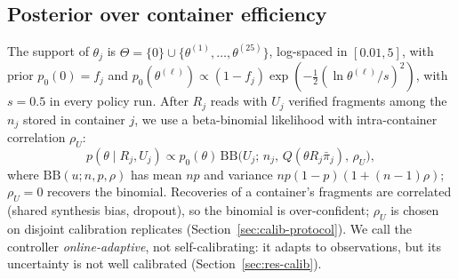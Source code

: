 \documentclass[conference,onecolumn,11pt]{IEEEtran}
\begin{document}
\subsection{Posterior over container efficiency}
The support of $\theta_j$ is $\Theta=\{0\}\cup\{\theta^{(1)},\dots,\theta^{(25)}\}$, log-spaced in
$[0.01,5]$, with prior $p_0(0)=f_j$ and $p_0(\theta^{(\ell)})\propto(1-f_j)\exp(-\frac12(\ln\theta^{(\ell)}/s)^2)$,
with $s=0.5$ in every policy run.  After $R_j$ reads with $U_j$ verified fragments among the $n_j$ stored in container
$j$, we use a beta-binomial likelihood with intra-container correlation $\rho_U$:
\begin{equation}
p(\theta\mid R_j,U_j)\propto p_0(\theta)\,\mathrm{BB}\big(U_j;\,n_j,\,Q(\theta R_j\bar\pi_j),\,\rho_U\big),
\label{eq:posterior}
\end{equation}
where $\mathrm{BB}(u;n,p,\rho)$ has mean $np$ and variance $np(1-p)(1+(n-1)\rho)$; $\rho_U{=}0$
recovers the binomial.  Recoveries of a container's fragments are correlated (shared synthesis
bias, dropout), so the binomial is over-confident; $\rho_U$ is chosen on disjoint calibration
replicates (Section~\ref{sec:calib-protocol}).  We call the controller \emph{online-adaptive},
not self-calibrating: it adapts to observations, but its uncertainty is not well calibrated
(Section~\ref{sec:res-calib}).
\end{document}
